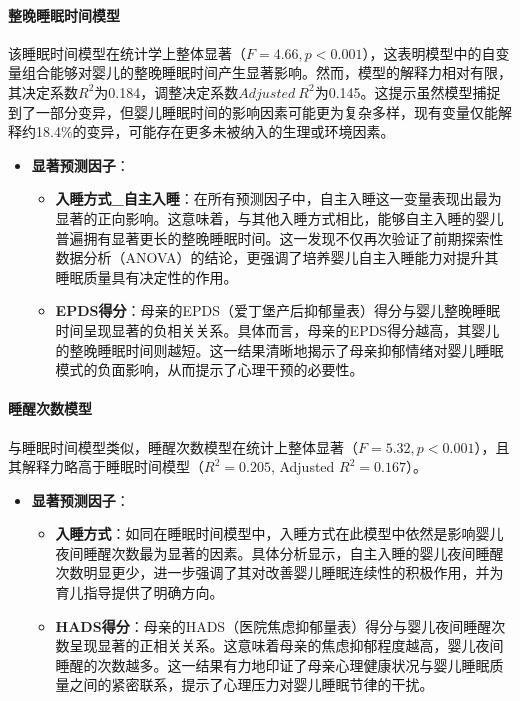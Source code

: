\documentclass[withoutpreface,bwprint]{cumcmthesis}
\begin{document}
\paragraph{整晚睡眠时间模型}
该睡眠时间模型在统计学上整体显著（$F=4.66, p < 0.001$），这表明模型中的自变量组合能够对婴儿的整晚睡眠时间产生显著影响。然而，模型的解释力相对有限，其决定系数$R^2$为0.184，调整决定系数$Adjusted~R^2$为0.145。这提示虽然模型捕捉到了一部分变异，但婴儿睡眠时间的影响因素可能更为复杂多样，现有变量仅能解释约18.4\%的变异，可能存在更多未被纳入的生理或环境因素。
\begin{itemize}
    \item \textbf{显著预测因子}：
    \begin{itemize}
        \item \textbf{入睡方式\_自主入睡}：在所有预测因子中，自主入睡这一变量表现出最为显著的正向影响。这意味着，与其他入睡方式相比，能够自主入睡的婴儿普遍拥有显著更长的整晚睡眠时间。这一发现不仅再次验证了前期探索性数据分析（ANOVA）的结论，更强调了培养婴儿自主入睡能力对提升其睡眠质量具有决定性的作用。
        \item \textbf{EPDS得分}：母亲的EPDS（爱丁堡产后抑郁量表）得分与婴儿整晚睡眠时间呈现显著的负相关关系。具体而言，母亲的EPDS得分越高，其婴儿的整晚睡眠时间则越短。这一结果清晰地揭示了母亲抑郁情绪对婴儿睡眠模式的负面影响，从而提示了心理干预的必要性。
    \end{itemize}
\end{itemize}

\paragraph{睡醒次数模型}
与睡眠时间模型类似，睡醒次数模型在统计上整体显著（$F=5.32, p < 0.001$），且其解释力略高于睡眠时间模型（$R^2 = 0.205$, Adjusted $R^2 = 0.167$）。
\begin{itemize}
    \item \textbf{显著预测因子}：
    \begin{itemize}
        \item \textbf{入睡方式}：如同在睡眠时间模型中，入睡方式在此模型中依然是影响婴儿夜间睡醒次数最为显著的因素。具体分析显示，自主入睡的婴儿夜间睡醒次数明显更少，进一步强调了其对改善婴儿睡眠连续性的积极作用，并为育儿指导提供了明确方向。
        \item \textbf{HADS得分}：母亲的HADS（医院焦虑抑郁量表）得分与婴儿夜间睡醒次数呈现显著的正相关关系。这意味着母亲的焦虑抑郁程度越高，婴儿夜间睡醒的次数越多。这一结果有力地印证了母亲心理健康状况与婴儿睡眠质量之间的紧密联系，提示了心理压力对婴儿睡眠节律的干扰。
    \end{itemize}
\end{itemize}
\end{document}
